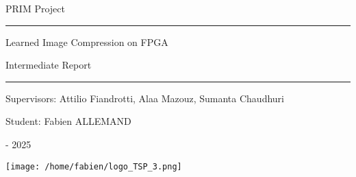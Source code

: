 \thispagestyle{empty}
\begin{center}

\vspace*{2.5cm}

{\fontsize{30}{30}\selectfont PRIM Project}

\rule{\textwidth}{1pt}

\medskip

{\fontsize{22}{22}\selectfont Learned Image Compression on FPGA}

{\fontsize{18}{18}\selectfont Intermediate Report}

\rule{\textwidth}{1pt}

\medskip

{\fontsize{18}{18}\selectfont Supervisors: Attilio Fiandrotti, Alaa Mazouz, Sumanta Chaudhuri}

\medskip

{\fontsize{18}{18}\selectfont Student: Fabien ALLEMAND}

\medskip

{\fontsize{14}{14} - 2025}

\vspace*{2.5cm}

\texttt{[image: /home/fabien/logo\_TSP\_3.png]}

\vfill

\end{center}
